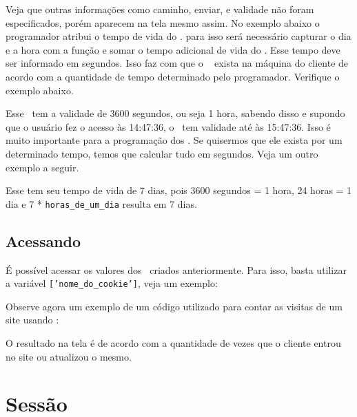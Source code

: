 Veja que outras informações como caminho, enviar, e validade não foram especificados, 
porém aparecem na tela mesmo assim. No exemplo abaixo o programador atribui o tempo de vida do 
\cookie. para isso será necessário capturar o dia e a hora com a função \funcaotime e somar o tempo 
adicional de vida do \cookie. Esse tempo deve ser informado em segundos. Isso faz com que o \cookie~
exista na máquina do cliente de acordo com a quantidade de tempo determinado pelo programador.
Verifique o exemplo abaixo.



Esse \cookie~tem a validade de 3600 segundos, ou seja 1 hora, sabendo disso e supondo que 
o usuário fez o acesso às 14:47:36, o \cookie~tem validade até às 15:47:36. Isso é muito 
importante para a programação dos \cookies. Se quisermos que ele exista por um determinado 
tempo, temos que calcular tudo em segundos. Veja um outro exemplo a seguir.



Esse \cookie tem seu tempo de vida de 7 dias, pois 3600 segundos = 1 hora, 24 horas = 1 
dia e 7 * \texttt{horas\_de\_um\_dia} resulta em 7 dias.

\subsection{Acessando \titulocookies}
\label{acessando-cookies}

É possível acessar os valores dos \cookies~criados anteriormente. Para isso, basta utilizar 
a variável \variavelcookie\texttt{['nome\_do\_cookie']}, veja um exemplo:



Observe agora um exemplo de um código utilizado para contar as visitas de um site 
usando \cookie:



O resultado na tela é de acordo com a quantidade de vezes que o cliente entrou no site 
ou atualizou o mesmo.

\section{Sessão}
\label{sessao}

